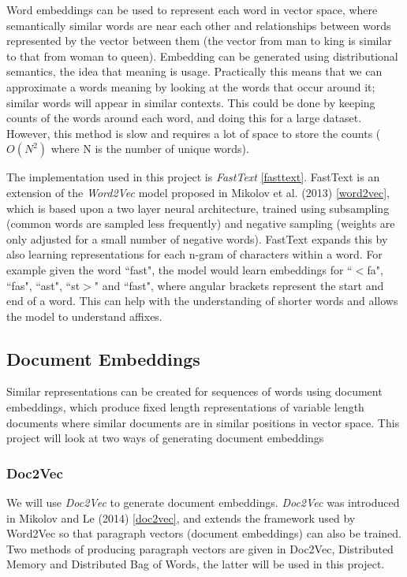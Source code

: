 \documentclass[12pt,a4paper,twoside,openright]{report}
\begin{document}
Word embeddings can be used to represent each word in vector space, where semantically similar words are near each other and relationships between words represented by the vector between them (the vector from man to king is similar to that from woman to queen). Embedding can be generated using distributional semantics, the idea that meaning is usage. Practically this means that we can approximate a words meaning by looking at the words that occur around it; similar words will appear in similar contexts. This could be done by keeping counts of the words around each word, and doing this for a large dataset. However, this method is slow and requires a lot of space to store the counts ($O(N^2)$ where N is the number of unique words).
\newline 

The implementation used in this project is \textit{FastText} \ref{fasttext}. FastText is an extension of the \textit{Word2Vec} model proposed in Mikolov et al. (2013) \ref{word2vec}, which is based upon a two layer neural architecture, trained using subsampling (common words are sampled less frequently) and negative sampling (weights are only adjusted for a small number of negative words). FastText expands this by also learning representations for each n-gram of characters within a word. For example given the word ``fast", the model would learn embeddings for ``$<$fa", ``fas", ``ast", ``st$>$" and ``fast", where angular brackets represent the start and end of a word. This can help with the understanding of shorter words and allows the model to understand affixes.

\subsection{Document Embeddings}
Similar representations can be created for sequences of words using document embeddings, which produce fixed length representations of variable length documents where similar documents are in similar positions in vector space. This project will look at two ways of generating document embeddings 

\subsubsection{Doc2Vec}
We will use \textit{Doc2Vec} to generate document embeddings. \textit{Doc2Vec} was introduced in Mikolov and Le (2014) \ref{doc2vec}, and extends the framework used by Word2Vec so that paragraph vectors (document embeddings) can also be trained. Two methods of producing paragraph vectors are given in Doc2Vec, Distributed Memory and Distributed Bag of Words, the latter will be used in this project. 
\end{document}
